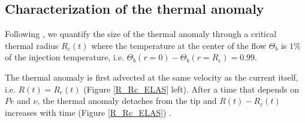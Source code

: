 \subsection{Characterization of the thermal anomaly}
\label{sec:char-therm-anom-e}

Following \citet{Garel:2012bh},  we quantify  the size of  the thermal
anomaly  through   a  critical  thermal  radius   $R_c(t)$  where  the
temperature  at the  center of  the flow  $\Theta_b$ is  $1\%$ of  the
injection temperature, i.e. $\Theta_b(r=0)-\Theta_b(r=R_c) = 0.99$.

The thermal  anomaly is first advected  at the same velocity as the
current itself,  i.e.  $R(t) = R_c(t)$  (Figure \ref{R_Rc_ELAS} left).
After  a time  that depends  on $Pe$  and $\nu$,  the thermal  anomaly
detaches from  the tip and  $R(t)-R_c(t)$ increases with  time (Figure
\ref{R_Rc_ELAS}) .

